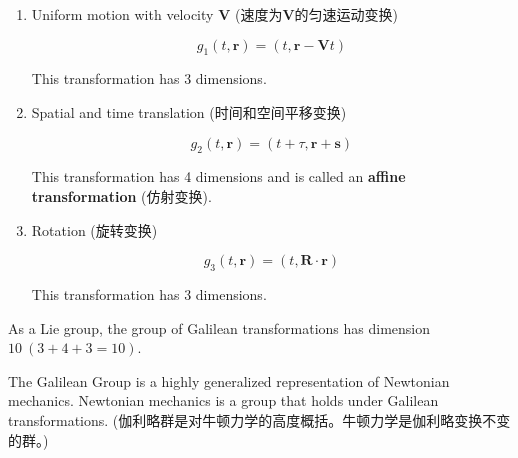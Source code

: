 \begin{enumerate}
\def\labelenumi{\arabic{enumi}.}
\item
  Uniform motion with velocity \(\boldsymbol{V}\)
  (速度为\(\boldsymbol{V}\)的匀速运动变换)

  \[g_1(t, \boldsymbol{r}) = (t, \boldsymbol{r} - \boldsymbol{V}t)\]

  This transformation has 3 dimensions.
\item
  Spatial and time translation (时间和空间平移变换)

  \[g_2(t, \boldsymbol{r}) = (t + \tau, \boldsymbol{r} + \boldsymbol{s})\]

  This transformation has 4 dimensions and is called an \textbf{affine
  transformation} (仿射变换).
\item
  Rotation (旋转变换)

  \[g_3(t, \boldsymbol{r}) = (t, \mathbf{R} \cdot \boldsymbol{r})\]

  This transformation has 3 dimensions.
\end{enumerate}

As a Lie group, the group of Galilean transformations has dimension
\(10 \ (3 + 4 + 3 = 10)\).

The Galilean Group is a highly generalized representation of Newtonian
mechanics. Newtonian mechanics is a group that holds under Galilean
transformations.
(伽利略群是对牛顿力学的高度概括。牛顿力学是伽利略变换不变的群。)
